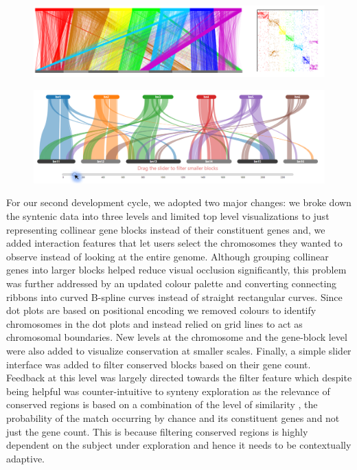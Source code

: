 \begin{figure}
  \centering
  \includegraphics[width=1\linewidth]{images/ch_4_first_iteration.PNG}
  \label{fig:ch_4_first_iteration}
\end{figure}

\begin{figure}[h]
  \centering
  \includegraphics[width=0.85\linewidth]{images/ch_4_base_viewer.PNG}
  \label{fig:ch_4_base_viewer}
\end{figure}


For our second development cycle, we adopted two major changes: we broke down the syntenic data into three levels and limited top level visualizations to just representing collinear gene blocks instead of their constituent genes and, we added interaction features that let users select the chromosomes they wanted to observe instead of looking at the entire genome. Although grouping collinear genes into larger blocks helped reduce visual occlusion significantly, this problem was further addressed by an updated colour palette and converting connecting ribbons into curved B-spline curves instead of straight rectangular curves. Since dot plots are based on positional encoding we removed colours to identify chromosomes in the dot plots and instead relied on grid lines to act as chromosomal boundaries. New levels at the chromosome and the gene-block level were also added to visualize conservation at smaller scales. Finally, a simple slider interface was added to filter conserved blocks based on their gene count. Feedback at this level was largely directed towards the filter feature which despite being helpful was counter-intuitive to synteny exploration as the relevance of conserved regions is based on a combination of the level of similarity , the probability of the match occurring by chance and its constituent genes and not just the gene count. This is because filtering conserved regions is highly dependent on the subject under exploration and hence it needs to be contextually adaptive.


